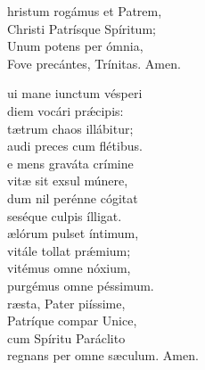 \noindent{}hristum rogámus et Patrem,\\ 
Christi Patrísque Spíritum;\\
Unum potens per ómnia,\\ 
Fove precántes, Trínitas. Amen.



\vspace{0.3cm}


\vspace{0.15cm}

\def\greinitialformat#1{{\fontsize{40}{40}\selectfont #1}}

\vspace{0.3cm}
\begin{multicols}{2}




\noindent{}ui mane iunctum vésperi\\
diem vocári prǽcipis:\\
tætrum chaos illábitur;\\
audi preces cum flétibus.\\

\noindent{}e mens graváta crímine\\
vitæ sit exsul múnere,\\ 
dum nil perénne cógitat\\
seséque culpis ílligat.\\

\noindent{}ælórum pulset íntimum,\\
vitále tollat prǽmium;\\
vitémus omne nóxium,\\ 
purgémus omne péssimum.\\

\noindent{}ræsta, Pater piíssime,\\ 
Patríque compar Unice,\\ 
cum Spíritu Paráclito\\
regnans per omne sæculum. Amen.


\end{multicols}

\newpage